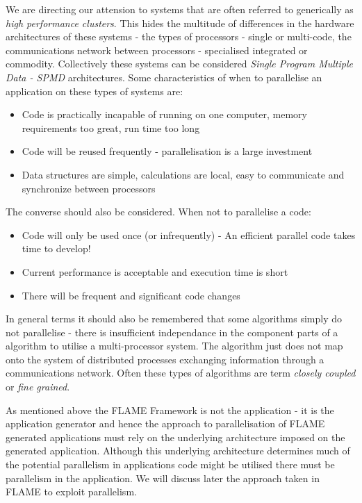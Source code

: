 We are directing our attension to systems that are often referred to generically as \textit{high performance clusters}. This hides the multitude of differences in the hardware architectures of these systems - the types of processors - single or multi-code, the communications network between processors - specialised integrated or commodity. Collectively these systems can be considered \textit{Single Program Multiple Data - SPMD} architectures. Some characteristics of when to parallelise an application on these types of systems are:
\begin{itemize}
\item Code is practically incapable of running on one computer, memory requirements too great, run time too long
\item Code will be reused frequently - parallelisation is a large investment
\item Data structures are simple, calculations are local, easy to communicate and synchronize between processors
\end{itemize}
The converse should also be considered. When not to parallelise a code:
\begin{itemize}
\item Code will only be used once (or infrequently) - An efficient parallel code takes time to develop!
\item Current performance is acceptable and execution time is short
\item There will be frequent and significant code changes
\end{itemize}
In general terms it should also be remembered that some algorithms simply do not parallelise - there is insufficient independance in the component parts of a algorithm to utilise a multi-processor system. The
algorithm just does not map onto the system of distributed processes exchanging information through a
communications network. Often these types of algorithms are term \textit{closely coupled} or \textit{fine grained}.

As mentioned above the FLAME Framework is not the application - it is the application generator and hence the approach to parallelisation of FLAME generated applications must rely on the underlying architecture imposed on the generated application. Although this underlying architecture determines much of the potential parallelism in applications code might be utilised there must be parallelism in the application. We will discuss later the approach taken in FLAME to exploit parallelism.

